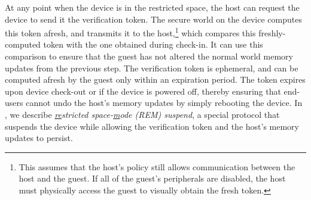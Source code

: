 \begin{mylist}
At any point when the device is in the restricted space, the host can request
the device to send it the verification token. The secure world on the device
computes this token afresh, and transmits it to the host,\footnote{This assumes
that the host's policy still allows communication between the host and the
guest. If all of the guest's peripherals are disabled, the host must physically
access the guest to visually obtain the fresh token.} which compares this
freshly-computed token with the one obtained during check-in. It can use this
comparison to ensure that the guest has not altered the normal world memory
updates from the previous step.  The verification token is ephemeral, and can
be computed afresh by the guest only within an expiration period. The token
expires upon device check-out or if the device is powered off, thereby ensuring
that end-users cannot undo the host's memory updates by simply rebooting the
device.  In , we describe
\textit{\underline{re}stricted space-\underline{m}ode (REM) suspend}, a special
protocol that suspends the device while allowing the verification token and the
host's memory updates to persist.
%
\end{mylist}

